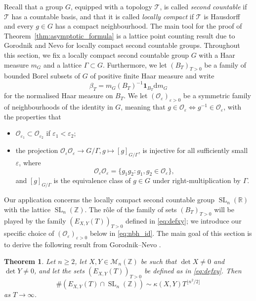 \documentclass[11pt,reqno]{amsart}
\newtheorem{thm}{Theorem}
\theoremstyle{definition}
\theoremstyle{remark}
\newcommand{\SL}{\operatorname{SL}}
\numberwithin{equation}{section}
\numberwithin{thm}{section}
\numberwithin{table}{section}
\def \R {{\mathbb R}}
\def \Z {{\mathbb Z}}
\begin{document}
 Recall that a group $G$, equipped with a topology $\mathcal{T}$,
is called {\it second countable} if $\mathcal{T}$ has a countable basis, and that it is called
{\it locally compact} if $\mathcal{T}$ is Hausdorff and every $g \in G$ has a compact neighbourhood. 
The main tool for the proof of Theorem~\ref{thm:asymptotic_formula} is a lattice point counting result due to Gorodnik and Nevo \cite{gorodnik_nevo} for
locally compact second countable groups.
Throughout this section, we fix a locally compact second countable group $G$ with a Haar measure $m_G$ and a lattice $\Gamma \subset G$. Furthermore, we let  $(B_T)_{T>0}$ be a family of bounded Borel subsets of $G$ of positive finite Haar measure and write 
$$
    \beta_T = m_G(B_T)^{-1} \mathbf{1}_{B_T} \mathrm{d}m_G
$$
for the normalised Haar measure on $B_T$. We let $(\mathcal{O}_\varepsilon)_{\varepsilon > 0}$ be a symmetric family of neighbourhoods of the identity in $G$, meaning that $g\in \mathcal{O}_\varepsilon \Leftrightarrow g^{-1}\in \mathcal{O}_\varepsilon$, 
 with the properties that 
\begin{itemize}
\item[(i)] $\mathcal{O}_{\varepsilon_1} \subset \mathcal{O}_{\varepsilon_2}$ if $\varepsilon_1 < \varepsilon_2$;
\item[(ii)] 
the projection $\mathcal{O}_{\varepsilon}  \mathcal{O}_{\varepsilon} \to G / \Gamma, g \mapsto [g]_{G/ \Gamma}$, is injective for all sufficiently small $\varepsilon$, where
\begin{equation}\label{eq:OO}
\mathcal{O}_{\varepsilon}  \mathcal{O}_{\varepsilon} = \{g_1 g_2: g_1, g_2 \in \mathcal{O}_\varepsilon \},
\end{equation}
 and $[g]_{G/ \Gamma}$ is the equivalence class of $g \in G$ under right-multiplication by $\Gamma$.
\end{itemize}

Our application concerns the locally compact second countable group $\SL_n(\R)$ with the lattice $\SL_n(\Z)$. The rôle of the family of sets $(B_T)_{T>0}$ will be played by the family $(E_{X,Y}(T))_{T>0}$  defined in \eqref{eq:defxy}; we introduce our specific choice of $(\mathcal{O}_\varepsilon)_{\varepsilon>0}$ below in \eqref{eq:nbh_id}.  The main goal of this section is to derive the following result from 
Gorodnik--Nevo \cite{gorodnik_nevo}.

\begin{thm} \label{lem:maincountinglemma}
    Let $n\ge 2$, let  $X, Y \in \mathcal{M}_{n}(\Z)$ be such that $\det X\neq 0$ and $\det Y\neq 0$,  and let the sets $(E_{X,Y}(T))_{T>0}$ be  defined as in \eqref{eq:defxy}. Then 
    \[
    \# (E_{X,Y}(T) \cap \SL_n(\Z)) \sim \kappa(X,Y) T^{\lfloor
    n^2/2 \rfloor} 
    \]
    as $T \to \infty$.
\end{thm}
\end{document}
